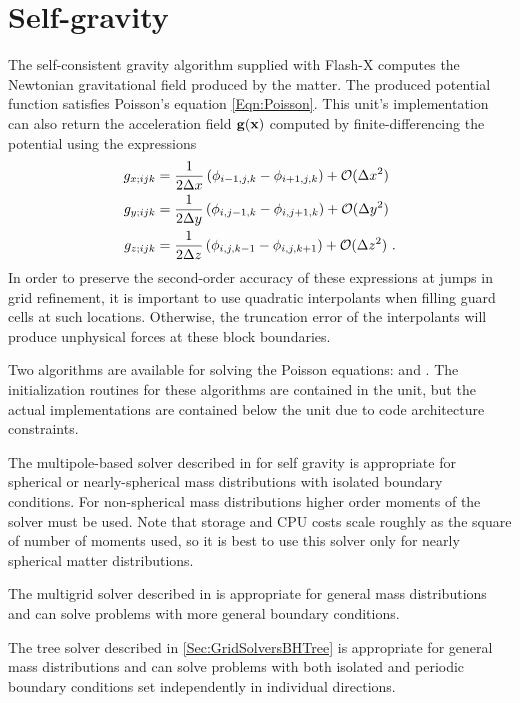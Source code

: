 \section{Self-gravity}
\label {Sec:GravitySelfgravity}
The self-consistent gravity algorithm supplied with Flash-X computes the
Newtonian gravitational field produced by the matter. The produced
potential function satisfies Poisson's equation
\eqref{Eqn:Poisson}. This unit's implementation
can also return the acceleration field ${\bf g}({\bf x})$
computed by finite-differencing the potential using the expressions
\begin{eqnarray}
\nonumber
g_{x;ijk} &= {1\over2\Delta x}\left(\phi_{i-1,j,k} - \phi_{i+1,j,k}\right) +
  {\cal O}(\Delta x^2) \\
g_{y;ijk} &= {1\over2\Delta y}\left(\phi_{i,j-1,k} - \phi_{i,j+1,k}\right) +
  {\cal O}(\Delta y^2) \\
\nonumber
g_{z;ijk} &= {1\over2\Delta z}\left(\phi_{i,j,k-1} - \phi_{i,j,k+1}\right) +
  {\cal O}(\Delta z^2) \ .
\end{eqnarray}
In order to preserve the second-order accuracy of these expressions at
jumps in grid refinement, it is important to use quadratic interpolants
when filling guard cells at such locations. Otherwise, the truncation error
of the interpolants will produce unphysical forces at these block boundaries.

Two algorithms are available for solving the Poisson equations:
 and .
The initialization routines for these algorithms are contained in the 
unit, but the actual implementations are contained below the  unit due
to code architecture constraints.

The multipole-based solver described in 
for self gravity is appropriate for spherical or nearly-spherical mass
distributions with isolated boundary conditions. For non-spherical
mass distributions higher order moments of the solver must be used. Note that
storage and CPU costs scale roughly as the square of number of moments
used, so it is best to use this solver only for nearly spherical
matter distributions.

The multigrid solver described in 
is appropriate for general mass distributions and can solve problems with
more general boundary conditions.

The tree solver described in \ref{Sec:GridSolversBHTree} is appropriate for
general mass distributions and can solve problems with both isolated and
periodic boundary conditions set independently in individual directions.


